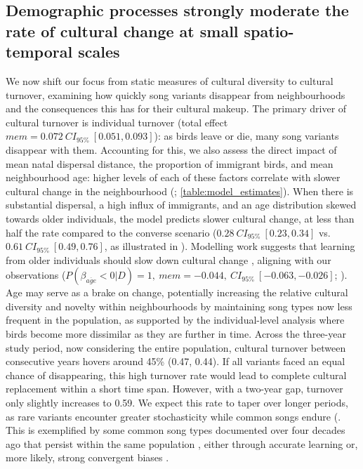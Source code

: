 \subsection{Demographic processes strongly moderate the rate of cultural change at small spatio-temporal scales}

We now shift our focus from static measures of cultural diversity to cultural turnover, examining how quickly song variants disappear from neighbourhoods and the consequences this has for their cultural makeup. The primary driver of cultural turnover is individual turnover (total effect $mem = 0.072~CI_{95\%}~[0.051, 0.093]$): as birds leave or die, many song variants disappear with them. Accounting for this, we also assess the direct impact of mean natal dispersal distance, the proportion of immigrant birds, and mean neighbourhood age: higher levels of each of these factors correlate with slower cultural change in the neighbourhood (; \autoref{table:model_estimates}). When there is substantial dispersal, a high influx of immigrants, and an age distribution skewed towards older individuals, the model predicts slower cultural change, at less than half the rate compared to the converse scenario ($0.28~CI_{95\%}~[0.23, 0.34]$ vs. $0.61~CI_{95\%}~[0.49, 0.76]$, as illustrated in ).
Modelling work suggests that learning from older individuals should slow down cultural change \parencite{kirby2021}, aligning with our observations ($P(\beta_{\overline{age}} < 0 | D) = 1,~mem=-0.044,~CI_{95\%}~[-0.063, -0.026]$; ). Age may serve as a brake on change, potentially increasing the relative cultural diversity and novelty within neighbourhoods  by maintaining song types now less frequent in the population, as supported by the individual-level analysis where birds become more dissimilar as they are further in time.
Across the three-year study period, now considering the entire population, cultural turnover between consecutive years hovers around 45\% (0.47, 0.44). If all variants faced an equal chance of disappearing, this high turnover rate would lead to complete cultural replacement within a short time span. However, with a two-year gap, turnover only slightly increases to 0.59. We expect this rate to taper over longer periods, as rare variants encounter greater stochasticity while common songs endure (. This is exemplified by some common song types documented over four decades ago that persist within the same population \parencite{mcgregor1982b, keen2020}, either through accurate learning or, more likely, strong convergent biases \parencite{lachlan2018, tchernichovski2021, james2017, claidiere2007}.


